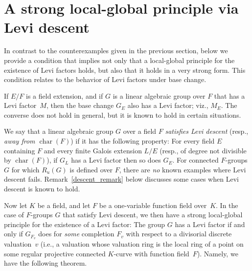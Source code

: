 \documentclass[12pt]{amsart}
\theoremstyle{plain}
\theoremstyle{definition}
\theoremstyle{remark}
\newcommand{\oper}[1]{\operatorname{#1}}
\newcommand{\cha}{\oper{char}}
\begin{document}
\section{A strong local-global principle via Levi descent}

In contrast to the counterexamples given in the previous section, below we provide a condition that implies not only that a local-global principle for the existence of Levi factors holds, but also that it holds in a very strong form.  This condition relates to the behavior of Levi factors under base change.

If $E/F$ is a field extension, and if $G$ is a linear algebraic group over $F$ that has a Levi factor~$M$, then the base change $G_E$ also has a Levi factor; viz., $M_E$.  The converse does not hold in general, but it is known to hold in certain situations.  

We say that a linear algebraic group $G$ over a field $F$ {\it satisfies Levi descent} (resp., {\it away from $\cha(F)$}) if it has the following property: For every field $E$ containing $F$ and every finite Galois extension $L/E$ (resp., of degree not divisible by $\cha(F)$), if $G_L$ has a Levi factor then so does $G_E$.  For connected $F$-groups $G$ for which $R_u(G)$ is defined over $F$, there are {\em no} known examples where Levi descent fails. Remark~\ref{descent_remark} below discusses some cases when Levi descent is known to hold.


Now let $K$ be a field, and let $F$ be a one-variable function field over~$K$. In the case of $F$-groups $G$ that satisfy Levi descent, we then have a strong local-global principle for the existence of a Levi factor: The group $G$ has a Levi factor if and only if $G_{F_v}$ does for {\it some} completion $F_v$ with respect to a divisorial discrete valuation~$v$ (i.e., a valuation whose valuation ring is the local ring of a point on some regular projective connected $K$-curve with function field~$F$). Namely, we have the following theorem.
\end{document}
